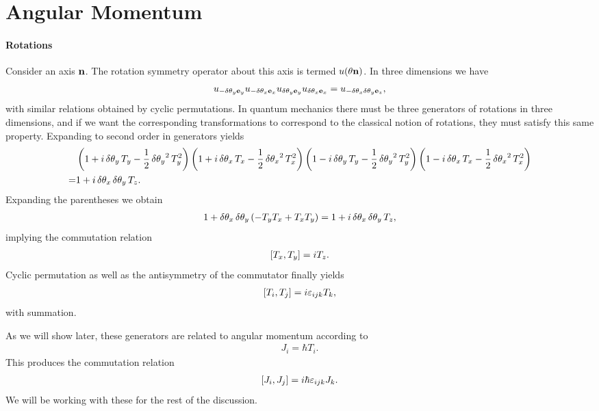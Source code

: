 \section{Angular Momentum}

\paragraph{Rotations}
Consider an axis $\vb{n}$. The rotation symmetry operator about this axis is termed $u(\theta\vb{n})$. In three dimensions we have
\begin{align*}
	u_{-\var{\theta_{y}}\vb{e}_{y}}u_{-\var{\theta_{x}}\vb{e}_{x}}u_{\var{\theta_{y}}\vb{e}_{y}}u_{\var{\theta_{x}}\vb{e}_{x}} = u_{-\var{\theta_{x}}\var{\theta_{y}}\vb{e}_{z}},
\end{align*}
with similar relations obtained by cyclic permutations. In quantum mechanics there must be three generators of rotations in three dimensions, and if we want the corresponding transformations to correspond to the classical notion of rotations, they must satisfy this same property. Expanding to second order in generators yields
\begin{align*}
	&\left(1 + i\var{\theta_{y}}T_{y} - \frac{1}{2}\var{\theta_{y}}^{2}T_{y}^{2}\right)\left(1 + i\var{\theta_{x}}T_{x} - \frac{1}{2}\var{\theta_{x}}^{2}T_{x}^{2}\right)\left(1 - i\var{\theta_{y}}T_{y} - \frac{1}{2}\var{\theta_{y}}^{2}T_{y}^{2}\right)\left(1 - i\var{\theta_{x}}T_{x} - \frac{1}{2}\var{\theta_{x}}^{2}T_{x}^{2}\right) \\
	=& 1 + i\var{\theta_{x}}\var{\theta_{y}}T_{z}.
\end{align*}
Expanding the parentheses we obtain
\begin{align*}
	1 + \var{\theta_{x}}\var{\theta_{y}}(-T_{y}T_{x} + T_{x}T_{y}) = 1 + i\var{\theta_{x}}\var{\theta_{y}}T_{z},
\end{align*}
implying the commutation relation
\begin{align*}
	\comm{T_{x}}{T_{y}} = iT_{z}.
\end{align*}
Cyclic permutation as well as the antisymmetry of the commutator finally yields
\begin{align*}
	\comm{T_{i}}{T_{j}} = i\varepsilon_{ijk}T_{k},
\end{align*}
with summation.

As we will show later, these generators are related to angular momentum according to
\begin{align*}
	J_{i} = \hbar T_{i}.
\end{align*}
This produces the commutation relation
\begin{align*}
	\comm{J_{i}}{J_{j}} = i\hbar\varepsilon_{ijk}J_{k}.
\end{align*}
We will be working with these for the rest of the discussion.

